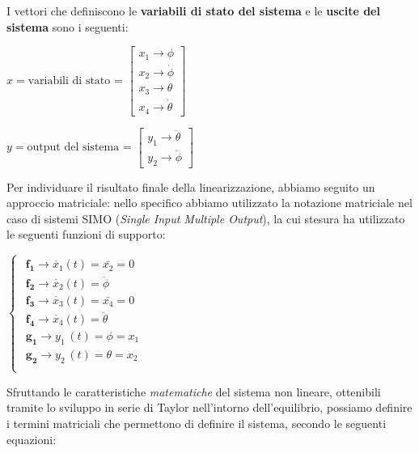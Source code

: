 I vettori che definiscono le \textbf{variabili di stato del sistema} e le \textbf{uscite del sistema} sono i seguenti:
\begin{center}
	$
	x=\text{variabili di stato = }\left\lbrack 
	\begin{array}{c}
		x_1 \to \phi\\
		x_2 \to \dot{\phi}\\
		x_3 \to \theta\\
		x_4 \to \dot{\theta} 
	\end{array}\right\rbrack
	$
	
	$
	y=\text{output del sistema = }\left\lbrack 
	\begin{array}{c}
		y_1 \to \ddot{\theta}\\
		y_2 \to \ddot{\phi}
	\end{array}\right\rbrack
	$
\end{center}

Per individuare il risultato finale della linearizzazione, abbiamo seguito un approccio matriciale: nello specifico abbiamo utilizzato la notazione matriciale nel caso di sistemi SIMO (\textit{Single Input Multiple Output}), la cui stesura ha utilizzato le seguenti funzioni di supporto:

\begin{center}
	$
	\begin{cases}
		\begin{array}{c}
			\mathbf{f_1} \to {\dot{x_1} \left(t\right)} =\bar{x_2 } =0\\
			\mathbf{f_2} \to {\dot{x_2} \left(t\right)} = {\ddot{\phi} \;}\\
			\mathbf{f_3} \to {\dot{x_3} \left(t\right)} =\bar{x_4 } =0\\
			\mathbf{f_4} \to {\dot{x_4} \left(t\right)=} {\ddot{\theta} \;}\\
			\mathbf{g_1} \to y_{1\;} \left(t\right)=\phi = x_{1\;}\\
			\mathbf{g_2} \to y_{2\;} \left(t\right)=\theta =x_{2\;}\\
		\end{array}
	\end{cases}
	$
\end{center}

Sfruttando le caratteristiche \textit{matematiche} del sistema non lineare, ottenibili tramite lo sviluppo in serie di Taylor nell'intorno dell'equilibrio, possiamo definire i termini matriciali che permettono di definire il sistema, secondo le seguenti equazioni:

